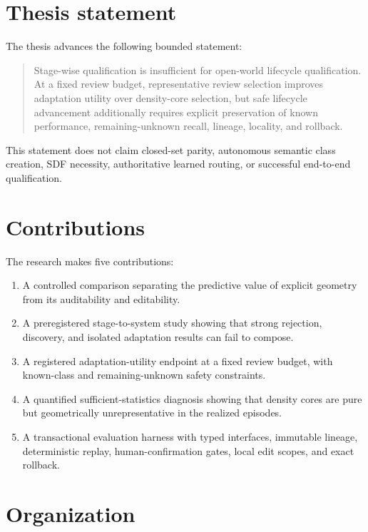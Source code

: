 \documentclass[12pt,oneside]{report}
\begin{document}
\section{Thesis statement}

The thesis advances the following bounded statement:

\begin{quote}
Stage-wise qualification is insufficient for open-world lifecycle
qualification. At a fixed review budget, representative review selection
improves adaptation utility over density-core selection, but safe lifecycle
advancement additionally requires explicit preservation of known performance,
remaining-unknown recall, lineage, locality, and rollback.
\end{quote}

This statement does not claim closed-set parity, autonomous semantic class
creation, SDF necessity, authoritative learned routing, or successful
end-to-end qualification.

\section{Contributions}

The research makes five contributions:

\begin{enumerate}
\item A controlled comparison separating the predictive value of explicit
geometry from its auditability and editability.

\item A preregistered stage-to-system study showing that strong rejection,
discovery, and isolated adaptation results can fail to compose.

\item A registered adaptation-utility endpoint at a fixed review budget, with
known-class and remaining-unknown safety constraints.

\item A quantified sufficient-statistics diagnosis showing that density cores
are pure but geometrically unrepresentative in the realized episodes.

\item A transactional evaluation harness with typed interfaces, immutable
lineage, deterministic replay, human-confirmation gates, local edit scopes,
and exact rollback.
\end{enumerate}

\section{Organization}
\end{document}
